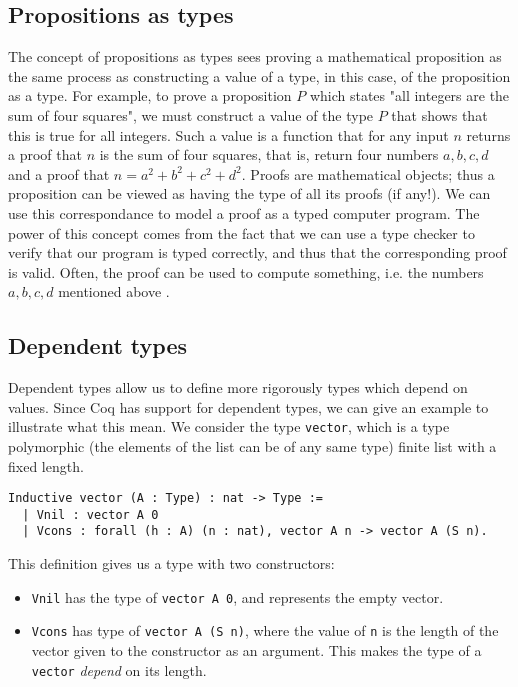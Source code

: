 \subsection{Propositions as types}
\label{ssec:propositions_as_types}


The concept of propositions as types sees proving a mathematical proposition
as the same process as constructing a value of a type, in this case,
of the proposition as a type.
For example, to prove a proposition $P$ which states "all integers are the sum of four squares",
we must construct a value of the type $P$ that shows that this is true for all integers.
Such a value is a function that for any input $n$ returns a proof that $n$ is the sum of four squares,
that is, return four numbers $a, b, c, d$ and a proof that $n = a^2 + b^2 + c^2 + d^2$.
Proofs are mathematical objects; thus a proposition can be viewed as having the type of all its proofs (if any!).
We can use this correspondance to model a proof as a typed computer program.
The power of this concept comes from the fact that we can use a type checker to verify that
our program is typed correctly, and thus that the corresponding proof is valid.
Often, the proof can be used to compute something, i.e. the numbers $a, b, c, d$ mentioned above
\cite{pwadler}.

\subsection{Dependent types}
\label{ssec:dependent_types}

Dependent types allow us to define more rigorously types which depend on values.
Since Coq has support for dependent types, we can give an example to illustrate what this mean.
We consider the type \lstinline{vector}, which is a type polymorphic (the elements of the list can be of any same type)
finite list with a fixed length.

\begin{minipage}{\linewidth}
\begin{lstlisting}[language=Coq, label={lst:dep_type_vec}, caption={\lstinline{vector} in Coq, using dependent types}]
Inductive vector (A : Type) : nat -> Type :=
  | Vnil : vector A 0
  | Vcons : forall (h : A) (n : nat), vector A n -> vector A (S n).
\end{lstlisting}
\end{minipage}

This definition gives us a type with two constructors:

\begin{itemize}
    \item
        \lstinline{Vnil} has the type of \lstinline{vector A 0}, and represents the empty vector.
    \item
        \lstinline{Vcons} has type of \lstinline{vector A (S n)}, where the value of \lstinline{n}
                            is the length of the vector given to the constructor as an argument.
                            This makes the type of a \lstinline{vector} \textit{depend} on its length.
\end{itemize}

